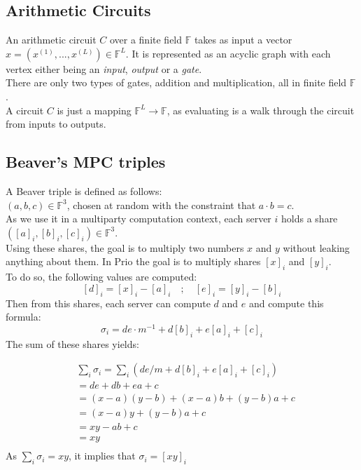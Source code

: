 \documentclass{article}
\begin{document}
\subsection{Arithmetic Circuits}
An arithmetic circuit $C$ over a finite field $\mathbb{F}$ takes as input a vector $x = (x^{(1)},...,x^{(L)}) \in \mathbb{F}^L $. It is represented as an acyclic graph with each vertex either being an \textit{input}, \textit{output} or a \textit{gate}.\\
There are only two types of gates, addition and multiplication, all in finite field $\mathbb{F}$.\\
A circuit $C$ is just a mapping $\mathbb{F}^L \rightarrow \mathbb{F}$, as evaluating is a walk through the circuit from inputs to outputs.

\subsection{Beaver's MPC triples}
A Beaver triple is defined as follows:\\
$(a,b,c) \in \mathbb{F}^3$, chosen at random with the constraint that $a \cdot b = c$.\\
As we use it in a multiparty computation context, each server $i$ holds a share $([a]_i , [b]_i , [c]_i) \in \mathbb{F}^3$.\\
Using these shares, the goal is to multiply two numbers $x$ and $y$ without leaking anything about them. In Prio the goal is to multiply shares $[x]_i$ and $[y]_i$.\\
To do so, the following values are computed:
$$[d]_i = [x]_i -[a]_i  \quad  ;  \quad  [e]_i = [y]_i - [b]_i$$ 
Then from this shares, each server can compute $d$ and $e$ and compute this formula:\\
$$\sigma_i = de \cdot m^{-1} + d[b]_i +e[a]_i + [c]_i$$
The sum of these shares yields:

\begin{equation}
\begin{split}
& \sum_{i} \sigma_i = \sum_{i}{(de/m +d[b]_i + e[a]_i + [c]_i)}\\
 & = de +db +ea + c\\
 & = (x-a)(y-b)+ (x-a)b + (y-b)a + c\\
 & = (x-a)y + (y-b)a + c\\
 & = xy -ab + c\\
 & = xy\\
\end{split}
\end{equation}
As $\sum_{i} \sigma_i = xy$, it implies that $\sigma_i = [xy]_i$ 
\end{document}
